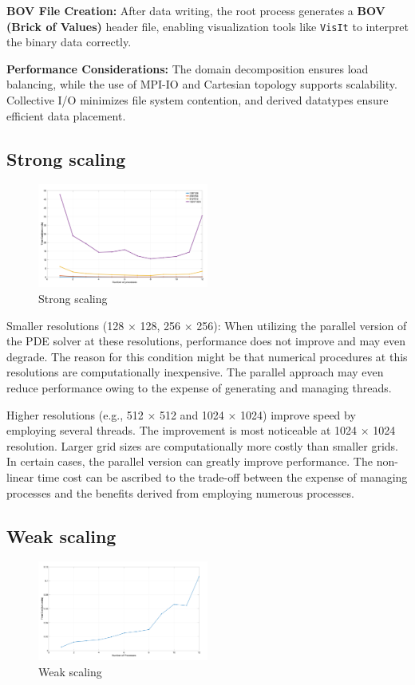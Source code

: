 \documentclass[unicode,11pt,a4paper,oneside,numbers=endperiod,openany]{scrartcl}
\begin{document}
\textbf{BOV File Creation:} After data writing, the root process generates a \textbf{BOV (Brick of Values)} header file, enabling visualization tools like \texttt{VisIt} to interpret the binary data correctly.

\textbf{Performance Considerations:} The domain decomposition ensures load balancing, while the use of MPI-IO and Cartesian topology supports scalability. Collective I/O minimizes file system contention, and derived datatypes ensure efficient data placement.

\subsection{Strong scaling}
\begin{figure}[h]
    \centering
    \includegraphics[width=0.5\textwidth]{pictures/strong.png}
    \caption{Strong scaling}
\end{figure}

Smaller resolutions (128 × 128, 256 × 256): When utilizing the parallel version of the PDE solver at these resolutions, performance does not improve and may even degrade. The reason for this condition might be that numerical procedures at this resolutions are computationally inexpensive. The parallel approach may even reduce performance owing to the expense of generating and managing threads.

Higher resolutions (e.g., 512 × 512 and 1024 × 1024) improve speed by employing several threads. The improvement is most noticeable at 1024 × 1024 resolution. Larger grid sizes are computationally more costly than smaller grids. In certain cases, the parallel version can greatly improve performance. The non-linear time cost can be ascribed to the trade-off between the expense of managing processes and the benefits derived from employing numerous processes.


\subsection{Weak scaling}
\begin{figure}[h]
    \centering
    \includegraphics[width=0.5\textwidth]{pictures/weak.png}
    \caption{Weak scaling}
\end{figure}
\end{document}
